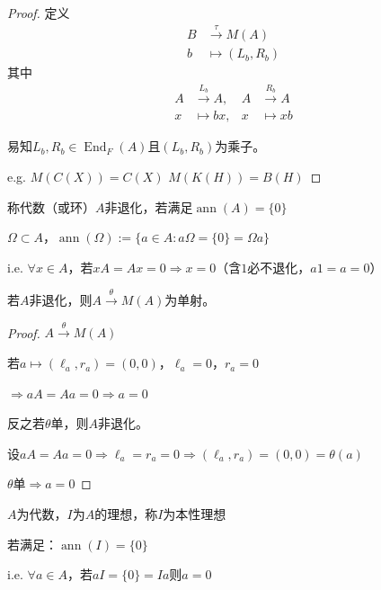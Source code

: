 \documentclass[lang=cn,a4paper,newtx,section]{elegantbook}
\begin{document}
\begin{proof}
  定义
  \begin{equation*}
    \begin{aligned}
      B &\xrightarrow{\tau} M(A) \\
      b &\longmapsto (L_b, R_b)
    \end{aligned}
  \end{equation*}
  其中
  \begin{equation*}
    \begin{aligned}
      A &\xrightarrow{L_b} A, & A &\xrightarrow{R_b} A \\
      x &\longmapsto bx, & x &\longmapsto xb
    \end{aligned}
  \end{equation*}
  
  易知$L_b, R_b \in \operatorname{End}_F(A)$且$(L_b, R_b)$为乘子。
  
  e.g. $M(C(X)) = C(X)$\quad
    $M(K(H)) = B(H)$
\end{proof}

\begin{definition}
  称代数（或环）$A$非退化，若满足$\operatorname{ann}(A) = \{0\}$
\end{definition}

\begin{definition}
  $\Omega \subset A$，$\operatorname{ann}(\Omega) := \{a \in A : a\Omega = \{0\} = \Omega a\}$
  
  i.e. $\forall x \in A$，若$xA = Ax = 0 \Rightarrow x = 0$（含$1$必不退化，$a1 = a = 0$）
\end{definition}

\begin{proposition}
  若$A$非退化，则$A \xrightarrow{\theta} M(A)$为单射。
\end{proposition}

\begin{proof}
  $A \xrightarrow{\theta} M(A)$
  
  若$a \longmapsto (\ell_a, r_a) = (0, 0)$，$\ell_a = 0$，$r_a = 0$
  
  $\Rightarrow aA = Aa = 0 \Rightarrow a = 0$
  
  反之若$\theta$单，则$A$非退化。
  
  设$aA = Aa = 0 \Rightarrow \ell_a = r_a = 0 \Rightarrow (\ell_a, r_a) = (0, 0) = \theta(a)$
  
  $\theta$单$\Rightarrow a = 0$
\end{proof}

\begin{definition}
  $A$为代数，$I$为$A$的理想，称$I$为本性理想
  
  若满足：$\operatorname{ann}(I) = \{0\}$
  
  i.e. $\forall a \in A$，若$aI = \{0\} = Ia$则$a = 0$
\end{definition}
\end{document}
